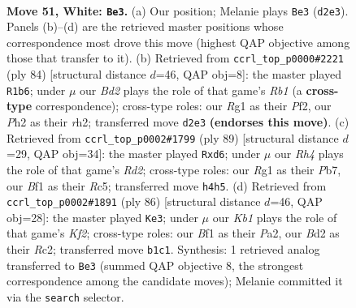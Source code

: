 \documentclass[11pt]{article}
\begin{document}
\clearpage

\begin{figure}[p]\centering
\begin{subfigure}{0.46\textwidth}\centering
\resizebox{\linewidth}{!}{%
\newchessgame
\chessboard[
  setfen={4n3/p1p1k3/8/5p2/r4P1R/8/r2B3P/1K3BR1 w - - 6 51},
  showmover=false,
  pgfstyle=straightmove, color=movearrow, markmove={d2-e3}
]}
\caption{}
\end{subfigure}\hfill
\begin{subfigure}{0.46\textwidth}\centering
\resizebox{\linewidth}{!}{%
\newchessgame
\chessboard[
  setfen={1Rb4r/5k2/2p2p2/8/P2B2p1/2P5/5P1r/1R3K2 w - - 0 43},
  showmover=false,
  pgfstyle=straightmove, color=movearrow, markmove={b1-b6}
]}
\caption{}
\end{subfigure}
\\[4pt]
\begin{subfigure}{0.46\textwidth}\centering
\resizebox{\linewidth}{!}{%
\newchessgame
\chessboard[
  setfen={8/1p1r1pRb/3P3k/2r5/P3p3/4N1RP/7K/8 b - - 5 45},
  showmover=false,
  pgfstyle=straightmove, color=movearrow, markmove={d7-d6}
]}
\caption{}
\end{subfigure}\hfill
\begin{subfigure}{0.46\textwidth}\centering
\resizebox{\linewidth}{!}{%
\newchessgame
\chessboard[
  setfen={6k1/3R1p2/p2P4/6p1/1p4P1/5P2/P1R2K2/3r1r2 w - - 3 44},
  showmover=false,
  pgfstyle=straightmove, color=movearrow, markmove={f2-e3}
]}
\caption{}
\end{subfigure}
\caption{\textbf{Move 51, White: \texttt{Be3}.} (a) Our position; Melanie plays \texttt{Be3} (\texttt{d2e3}). Panels (b)--(d) are the retrieved master positions whose correspondence most drove this move (highest QAP objective among those that transfer to it). (b) Retrieved from \texttt{ccrl\_top\_p0000\#2221} (ply 84) [structural distance $d$=46, QAP obj=8]: the master played \texttt{R1b6}; under $\mu$ our \emph{Bd2} plays the role of that game's \emph{Rb1} (a \textbf{cross-type} correspondence); cross-type roles: our \emph{R}g1 as their \emph{P}f2, our \emph{P}h2 as their \emph{r}h2; transferred move \texttt{d2e3} \textbf{(endorses this move)}. (c) Retrieved from \texttt{ccrl\_top\_p0002\#1799} (ply 89) [structural distance $d$=29, QAP obj=34]: the master played \texttt{Rxd6}; under $\mu$ our \emph{Rh4} plays the role of that game's \emph{Rd2}; cross-type roles: our \emph{R}g1 as their \emph{P}b7, our \emph{B}f1 as their \emph{R}c5; transferred move \texttt{h4h5}. (d) Retrieved from \texttt{ccrl\_top\_p0002\#1891} (ply 86) [structural distance $d$=46, QAP obj=28]: the master played \texttt{Ke3}; under $\mu$ our \emph{Kb1} plays the role of that game's \emph{Kf2}; cross-type roles: our \emph{B}f1 as their \emph{P}a2, our \emph{B}d2 as their \emph{R}c2; transferred move \texttt{b1c1}. Synthesis: 1 retrieved analog transferred to \texttt{Be3} (summed QAP objective 8, the strongest correspondence among the candidate moves); Melanie committed it via the \texttt{search} selector.}
\label{fig:thought-m100}
\end{figure}
\end{document}

